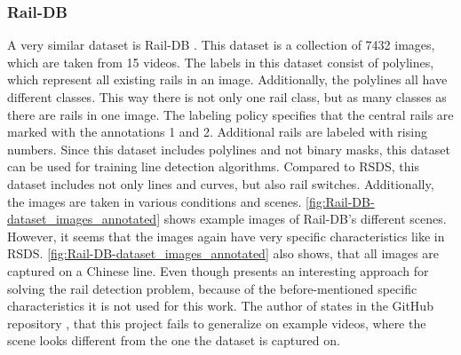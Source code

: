 \subsubsection{Rail-DB}
A very similar dataset is Rail-DB \cite{li2022rail}.
This dataset is a collection of 7432 images, which are taken from 15 videos.
The labels in this dataset consist of polylines, which represent all existing rails in an image.
Additionally, the polylines all have different classes. This way there is not only one rail class, but as many classes as there are rails in one image.
The labeling policy specifies that the central rails are marked with the annotations 1 and 2.
Additional rails are labeled with rising numbers.
Since this dataset includes polylines and not binary masks, this dataset can be used for training line detection algorithms.
Compared to \ac{RSDS}, this dataset includes not only lines and curves, but also rail switches.
Additionally, the images are taken in various conditions and scenes.
\autoref{fig:Rail-DB-dataset_images_annotated} shows example images of Rail-DB's different scenes.
However, it seems that the images again have very specific characteristics like in \ac{RSDS}.
\autoref{fig:Rail-DB-dataset_images_annotated} also shows, that all images are captured on a Chinese line.
Even though \cite{li2022rail} presents an interesting approach for solving the rail detection problem,
because of the before-mentioned specific characteristics it is not used for this work. The author of \cite{li2022rail} states in the GitHub repository \cite{railNet2022GitHub},
that this project fails to generalize on example videos, where the scene looks different from the one the dataset is captured on.

